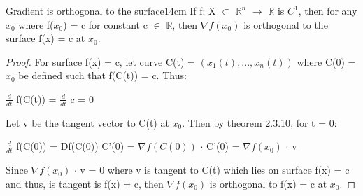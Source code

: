     \begin{wtheorem}{Gradient is orthogonal to the surface}{14cm}
        If f: X $\subset$ $\mathbb{R}^n$ $\rightarrow$ $\mathbb{R}$
        is $C^1$, then for any $x_0$ where f($x_0$) = c for constant
        c $\in$ $\mathbb{R}$, then $\nabla f(x_0)$ is orthogonal
        to the surface f(x) = c at $x_0$.
    \end{wtheorem}

    \begin{proof}
        For surface f(x) = c, let curve C(t) = $(x_1(t),...,x_n(t))$
        where C(0) = $x_0$ be defined such that f(C(t)) = c.
        Thus:

        \hspace{0.5cm}
        $\frac{d}{dt}$ f(C(t))
        = $\frac{d}{dt}$ c = 0

        Let v be the tangent vector to C(t) at $x_0$.
        Then by {\color{red} theorem 2.3.10}, for t = 0:

        \hspace{0.5cm}
        $\frac{d}{dt}$ f(C(0))
        = Df(C(0)) C'(0)
        = $\nabla f(C(0))$ $\cdot$ C'(0)
        = $\nabla f(x_0)$ $\cdot$ v

        Since $\nabla f(x_0)$ $\cdot$ v = 0
        where v is tangent to C(t) which lies on surface f(x) = c and thus,
        is tangent is f(x) = c, then $\nabla f(x_0)$ is orthogonal to f(x) = c
        at $x_0$.
    \end{proof}




    